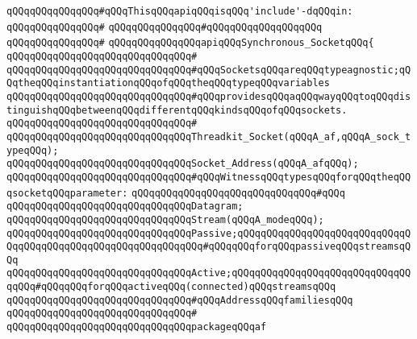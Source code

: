 \verb|qQQqqQQqqQQqqQQq#qQQqThisqQQqapiqQQqisqQQq'include'-dqQQqin:|\newline
\verb|qQQqqQQqqQQqqQQq#|\newline
\verb|qQQqqQQqqQQqqQQq#qQQqqQQqqQQqqQQqqQQq|\newline
\verb|qQQqqQQqqQQqqQQq#|\newline
\verb|qQQqqQQqqQQqqQQqapiqQQqSynchronous_SocketqQQq{|\newline
\verb|qQQqqQQqqQQqqQQqqQQqqQQqqQQqqQQq#|\newline
\newline
\verb|qQQqqQQqqQQqqQQqqQQqqQQqqQQqqQQq#qQQqSocketsqQQqareqQQqtypeagnostic;qQQqtheqQQqinstantiationqQQqofqQQqtheqQQqtypeqQQqvariables|\newline
\verb|qQQqqQQqqQQqqQQqqQQqqQQqqQQqqQQq#qQQqprovidesqQQqaqQQqwayqQQqtoqQQqdistinguishqQQqbetweenqQQqdifferentqQQqkindsqQQqofqQQqsockets.|\newline
\verb|qQQqqQQqqQQqqQQqqQQqqQQqqQQqqQQq#|\newline
\verb|qQQqqQQqqQQqqQQqqQQqqQQqqQQqqQQqThreadkit_Socket(qQQqA_af,qQQqA_sock_typeqQQq);|\newline
\verb|qQQqqQQqqQQqqQQqqQQqqQQqqQQqqQQqSocket_Address(qQQqA_afqQQq);|\newline
\newline
\verb|qQQqqQQqqQQqqQQqqQQqqQQqqQQqqQQq#qQQqWitnessqQQqtypesqQQqforqQQqtheqQQqsocketqQQqparameter:|\newline
\verb|qQQqqQQqqQQqqQQqqQQqqQQqqQQqqQQq#qQQq|\newline
\verb|qQQqqQQqqQQqqQQqqQQqqQQqqQQqqQQqDatagram;|\newline
\verb|qQQqqQQqqQQqqQQqqQQqqQQqqQQqqQQqStream(qQQqA_modeqQQq);|\newline
\verb|qQQqqQQqqQQqqQQqqQQqqQQqqQQqqQQqPassive;qQQqqQQqqQQqqQQqqQQqqQQqqQQqqQQqqQQqqQQqqQQqqQQqqQQqqQQqqQQqqQQq#qQQqqQQqforqQQqpassiveqQQqstreamsqQQq|\newline
\verb|qQQqqQQqqQQqqQQqqQQqqQQqqQQqqQQqActive;qQQqqQQqqQQqqQQqqQQqqQQqqQQqqQQqqQQq#qQQqqQQqforqQQqactiveqQQq(connected)qQQqstreamsqQQq|\newline
\newline
\verb|qQQqqQQqqQQqqQQqqQQqqQQqqQQqqQQq#qQQqAddressqQQqfamiliesqQQq|\newline
\verb|qQQqqQQqqQQqqQQqqQQqqQQqqQQqqQQq#|\newline
\verb|qQQqqQQqqQQqqQQqqQQqqQQqqQQqqQQqpackageqQQqaf|\newline
